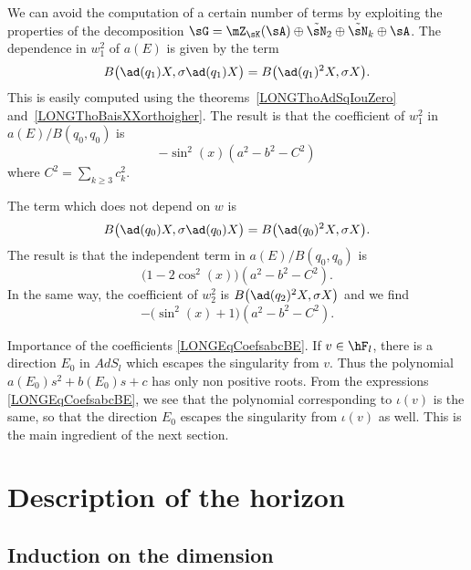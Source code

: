 %
We can avoid the computation of a certain number of terms by exploiting the properties of the decomposition $\sG=\mZ_{\sK}(\sA)\oplus\tilde\sN_2\oplus\tilde\sN_k\oplus\sA$. The dependence in $w_1^2$ of $a(E)$ is given by the term
\begin{equation}
	B\big( \ad(q_1)X,\sigma\ad(q_1)X \big)=B\big( \ad(q_1)^2X,\sigma X \big).
\end{equation}
This is easily computed using the theorems~\ref{LONGThoAdSqIouZero} and~\ref{LONGThoBaisXXorthoigher}. The result is that the coefficient of $w_1^2$ in $a(E)/B(q_0,q_0)$ is
\begin{equation}
	-\sin^2(x)(a^2-b^2- C^2)
\end{equation}
where $C^2=\sum_{k\geq 3}c_k^2$.

The term which does not depend on $w$ is
\begin{equation}
	B\big( \ad(q_0)X,\sigma\ad(q_0)X \big)=B\big( \ad(q_0)^2X,\sigma X \big).
\end{equation}
The result is that the independent term in $a(E)/B(q_0,q_0)$ is
\begin{equation}
	\big( 1-2\cos^2(x) \big)(a^2-b^2-C^2).
\end{equation}
In the same way, the coefficient of $w_2^2$ is $B\big( \ad(q_2)^2X,\sigma X \big)$ and we find
\begin{equation}
	-\big( \sin^2(x)+1 \big)(a^2-b^2-C^2).
\end{equation}


\begin{remark}    \label{LONGRemImapoabcE}
	Importance of the coefficients \eqref{LONGEqCoefsabcBE}. If $v\in\hF_l$, there is a direction $E_0$ in $AdS_l$ which escapes the singularity from $v$. Thus the polynomial $a(E_0)s^2+b(E_0)s+c$ has only non positive roots. From the expressions \eqref{LONGEqCoefsabcBE}, we see that the polynomial corresponding to $\iota(v)$ is the same, so that the direction $E_0$ escapes the singularity from $\iota(v)$ as well. This is the main ingredient of the next section.
\end{remark}

%
\section{Description of the horizon}
%
\label{LONGSecHorizonSansMatrices}

%
\subsection{Induction on the dimension}
%

